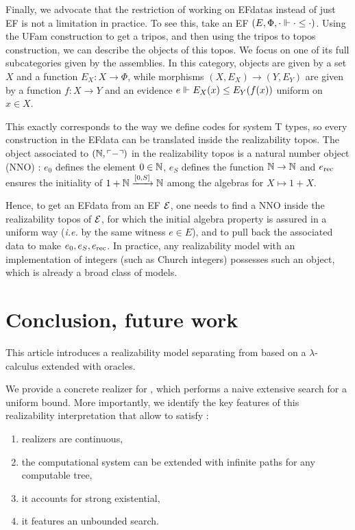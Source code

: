 \documentclass[a4paper,UKenglish,cleveref, autoref, thm-restate]{lipics-v2021}
\begin{document}
Finally, we advocate that the restriction of working on EFdatas instead of just EF is not a limitation in practice.
To see this, take an EF $(E,\Phi,\cdot \Vdash \cdot \leq \cdot)$. Using the UFam construction \cite{CohMiqTat21,JacobsCLTT} to get a tripos, and then using the tripos to topos construction, we can describe the objects of this topos. We focus on one of its full subcategories given by the assemblies. In this category, objects are given by a set $X$ and a function $E_X : X \to \Phi$,
while morphisms $(X,E_X) \to (Y,E_Y)$ are given by a function $f : X \to Y$ and an evidence $e \Vdash E_X(x) \leq E_Y(f(x))$ uniform on $x \in X$.

This exactly corresponds to the way we define codes for system T types, so every construction in the EFdata can be translated inside the realizability topos. The object associated to $(\mathbb N,\ulcorner-\urcorner)$ in the realizability topos is a natural number object (NNO) \cite{Lawvere1963}: $e_0$ defines the element $0 \in \mathbb N$, $e_S$ defines the function $\mathbb N \to \mathbb N$ and $e_{\mathrm{rec}}$ ensures the initiality of $1+\mathbb N \xrightarrow{[0,S]} \mathbb N$ among the algebras for $X\mapsto 1+X$.



Hence, to get an EFdata from an EF $\mathcal{E}$, one needs to find a NNO inside the realizability topos of $\mathcal{E}$, for which the initial algebra property is assured in a uniform way (\textit{i.e.} by the same witness $e \in E$), and to pull back the associated data to make $e_0,e_S,e_{\mathrm{rec}}$. In practice, any realizability model with an implementation of integers (such as Church integers) possesses such an object, which is already a broad class of models.


\section{Conclusion, future work}


This article introduces a realizability model separating \FT from \WKL
based on a $\lambda$-calculus extended with oracles.




We provide a concrete realizer for \FT, which performs a naive extensive search for
a uniform bound. More importantly, we identify the key features of this realizability
interpretation that allow to satisfy \FT:
\begin{enumerate}[ (i)]
\item realizers are continuous,
\item the computational system can be extended with infinite paths
for any computable tree,
\item it accounts for strong existential,
\item it features an unbounded search.
\end{enumerate}
\end{document}
